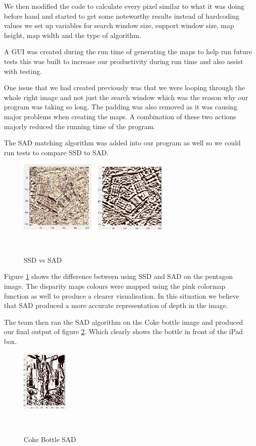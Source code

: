 \documentclass[twocolumn]{article}
\begin{document}
We then modified the code to calculate every pixel similar to what it was doing before hand and started to get some noteworthy results instead of hardcoding values we set up variables for search window size, support window size, map height, map width and the type of algorithm.

A GUI was created during the run time of generating the maps to help run future tests this was built to increase our productivity during run time and also assist with testing. 

One issue that we had created previously was that we were looping through the whole right image and not just the search window which was the reason why our program was taking so long. The padding was also removed as it was causing major problems when creating the maps. A combination of these two actions majorly reduced the running time of the program.    

The SAD matching algorithm was added into our program as well so we could run tests to compare SSD to SAD. 

 \begin{figure}[H]
\centering
  \includegraphics[height=35mm]{Figures/SSDvsSAD}
    \caption{SSD vs SAD}~\label{fig:SSDvsSAD}
\end{figure} 

Figure \ref{fig:SSDvsSAD} shows the difference between using SSD and SAD on the pentagon image. The disparity maps colours were mapped using the pink colormap function as well to produce a clearer visualisation. In this situation we believe that SAD produced a more accurate representation of depth in the image. 

The team then ran the SAD algorithm on the Coke bottle image and produced our final output of figure \ref{fig:Coke_Bottle}. Which clearly shows the bottle in front of the iPad box. 

 \begin{figure}[H]
\centering
  \includegraphics[height=30mm]{Figures/Coke_Bottle}
    \caption{Coke Bottle SAD}~\label{fig:Coke_Bottle}
\end{figure} 
\end{document}

